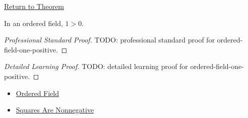 \newpage
{}
\label{prf:ordered-field-one-positive}

\begin{remark*}[Return]
\hyperref[thm:ordered-field-one-positive]{Return to Theorem}
\end{remark*}

\begin{theorem*}
In an ordered field, $1>0$.
\end{theorem*}

\begin{proof}[Professional Standard Proof]
\LRAProofBodyStart
TODO: professional standard proof for ordered-field-one-positive.
\end{proof}

\begin{proof}[Detailed Learning Proof]
\LRAProofBodyStart
TODO: detailed learning proof for ordered-field-one-positive.
\end{proof}

\begin{remark*}
\end{remark*}

\begin{dependencies}
\begin{itemize}
  \item \hyperref[def:ordered-field]{Ordered Field}
  \item \hyperref[thm:ordered-field-squares-nonnegative]{Squares Are Nonnegative}
\end{itemize}
\end{dependencies}

\clearpage
